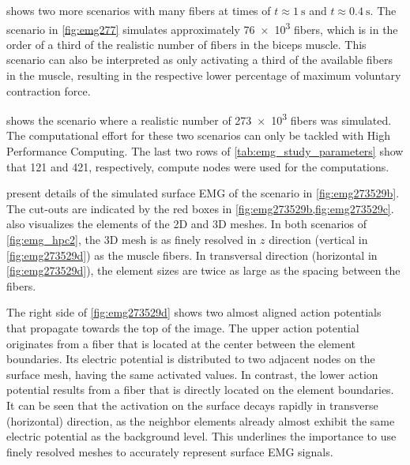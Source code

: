  shows two more scenarios with many fibers at times of $t\approx \SI{1}{\s}$ and $t\approx \SI{0.4}{\s}$. The scenario in \cref{fig:emg277} simulates approximately \num{76e3} fibers, which is in the order of a third of the realistic number of fibers in the biceps muscle. 
This scenario can also be interpreted as only activating a third of the available fibers in the muscle, resulting in the respective lower percentage of maximum voluntary contraction force.

 shows the scenario where a realistic number of \num{273e3} fibers was simulated. The computational effort for these two scenarios can only be tackled with High Performance Computing. The last two rows of \cref{tab:emg_study_parameters} show that 121 and 421, respectively, compute nodes were used for the computations.

 present details of the simulated surface EMG of the scenario in \cref{fig:emg273529b}. The cut-outs are indicated by the red boxes in \cref{fig:emg273529b,fig:emg273529c}.  also visualizes the elements of the 2D and 3D meshes. In both scenarios of \cref{fig:emg_hpc2}, the 3D mesh is as finely resolved in $z$ direction (vertical in \cref{fig:emg273529d}) as the muscle fibers. In transversal direction (horizontal in \cref{fig:emg273529d}), the element sizes are twice as large as the spacing between the fibers. 

The right side of \cref{fig:emg273529d} shows two almost aligned action potentials that propagate towards the top of the image. The upper action potential originates from a fiber that is located at the center between the element boundaries. Its electric potential is distributed to two adjacent nodes on the surface mesh, having the same activated values.
In contrast, the lower action potential results from a fiber that is directly located on the element boundaries. It can be seen that the activation on the surface decays rapidly in transverse (horizontal) direction, as the neighbor elements already almost exhibit the same electric potential as the background level. This underlines the importance to use finely resolved meshes to accurately represent surface EMG signals.


